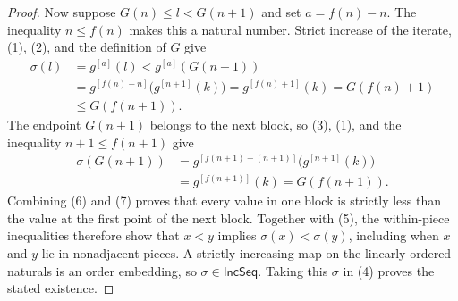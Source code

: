 \begin{proof}
Now suppose $G(n)\leq l<G(n+1)$ and set $a=f(n)-n$.  The inequality
$n\leq f(n)$ makes this a natural number.  Strict increase of the iterate,
(1), (2), and the definition of $G$ give
\[
\begin{aligned}
\sigma(l)
 &=g^{[a]}(l)
  <g^{[a]}(G(n+1))\\
 &=g^{[f(n)-n]}\bigl(g^{[n+1]}(k)\bigr)
  =g^{[f(n)+1]}(k)
  =G(f(n)+1)\\
 &\leq G(f(n+1)).
\end{aligned}
\tag{6}
\]
The endpoint $G(n+1)$ belongs to the next block, so (3), (1), and the
inequality $n+1\leq f(n+1)$ give
\[
\begin{aligned}
\sigma(G(n+1))
 &=g^{[f(n+1)-(n+1)]}\bigl(g^{[n+1]}(k)\bigr)\\
 &=g^{[f(n+1)]}(k)=G(f(n+1)).
\end{aligned}
\tag{7}
\]
Combining (6) and (7) proves that every value in one block is strictly less
than the value at the first point of the next block.  Together with (5), the
within-piece inequalities therefore show that $x<y$ implies
$\sigma(x)<\sigma(y)$, including when $x$ and $y$ lie in nonadjacent pieces.
A strictly increasing map on the linearly ordered naturals is an order
embedding, so $\sigma\in\mathsf{IncSeq}$.  Taking this $\sigma$ in (4)
proves the stated existence.
\end{proof}
